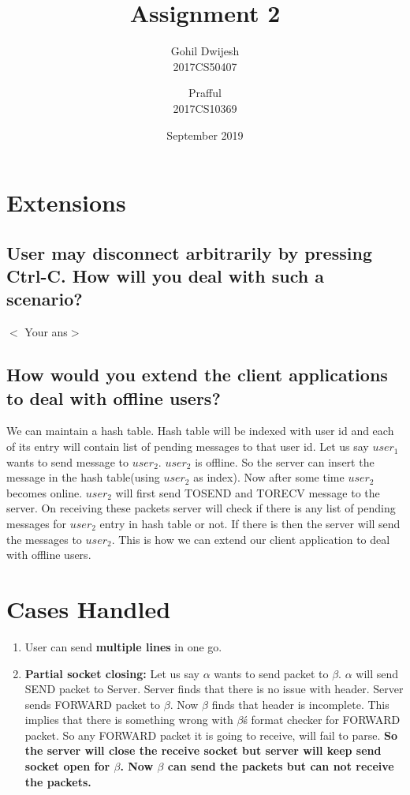 \documentclass{article}
\title{Assignment 2}
\author{Gohil Dwijesh \\ 2017CS50407
        \and Prafful \\ 2017CS10369}
\date{September 2019}
\begin{document}
\maketitle
\section{Extensions}
    \subsection{User may disconnect arbitrarily by pressing Ctrl-C. How will you deal with such a scenario?}
        $<$ Your ans$>$
    \subsection{How would you extend the client applications to deal with offline users?}
    We can maintain a hash table. Hash table will be indexed with user id and each of its entry will contain list of pending messages to that user id. Let us say $user_{1}$ wants to send message to $user_{2}$. $user_{2}$ is offline. So the server can insert the message in the hash table(using $user_{2}$ as index). Now after some time $user_{2}$ becomes online. $user_{2}$ will first send TOSEND and TORECV message to the server. On receiving these packets server will check if there is any list of pending messages for $user_{2}$ entry in hash table or not. If there is then the server will send the messages to $user_{2}$. This is how we can extend our client application to deal with offline users.
\section{Cases Handled}
\begin{enumerate}
    \item User can send \textbf{multiple lines} in one go.
    \item \textbf{Partial socket closing:} Let us say $\alpha$ wants to send packet to $\beta$. $\alpha$ will send SEND packet to Server. Server finds that there is no issue with header. Server sends FORWARD packet to $\beta$. Now $\beta$ finds that header is incomplete. This implies that there is something wrong with $\beta$\'s format checker for FORWARD packet. So any FORWARD packet it is going to receive, will fail to parse. \textbf{So the server will close the receive socket but server will keep send socket open for $\beta$. Now $\beta$ can send the packets but can not receive the packets.}
\end{enumerate}{}
\end{document}
